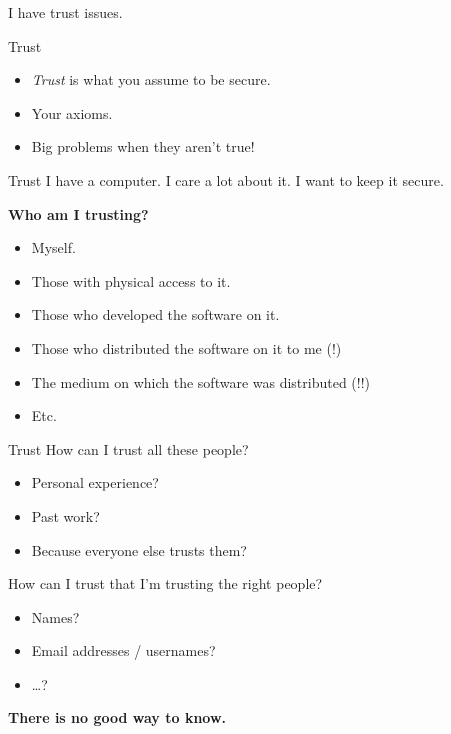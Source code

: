 \documentclass{beamer}
\begin{document}
\begin{frame}{}
  \centerline{\Huge I have trust issues.}
\end{frame}

\begin{frame}{Trust}
  \begin{itemize}
  \item\textit{Trust} is what you assume to be secure.
  \item Your axioms.
  \item Big problems when they aren't true!
  \end{itemize}
\end{frame}

\begin{frame}{Trust}
  I have a computer.  I care a lot about it.  I want to keep it
  secure.

  \textbf{Who am I trusting?}
  \pause
  \begin{itemize}
  \item Myself.
    \pause
  \item Those with physical access to it.
    \pause
  \item Those who developed the software on it.
    \pause
  \item Those who distributed the software on it to me (!)
    \pause
  \item The medium on which the software was distributed (!!)
    \pause
  \item Etc.
  \end{itemize}
\end{frame}

\begin{frame}{Trust}
  How can I trust all these people?
  \begin{itemize}
  \item Personal experience?
  \item Past work?
  \item Because everyone else trusts them?
  \end{itemize}

  \pause
  How can I trust that I'm trusting the right people?
  \begin{itemize}
  \item Names?
  \item Email addresses / usernames?
  \item \dots?
  \end{itemize}

  \pause
  \textbf{There is no good way to know.}
\end{frame}
\end{document}
